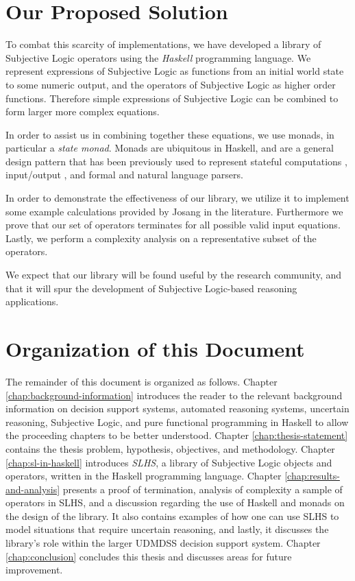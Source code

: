 \documentclass[thesis.tex]{subfiles}
\begin{document}
\section{Our Proposed Solution}

To combat this scarcity of implementations, we have developed a library of Subjective Logic
operators using the \emph{Haskell} programming language. We represent
expressions of Subjective Logic as functions from an initial world state to some
numeric output, and the operators of Subjective Logic as higher order functions.
Therefore simple expressions of Subjective Logic can be combined to form larger
more complex equations.

In order to assist us in combining together these equations, we use monads,
in particular a \emph{state monad}. Monads are ubiquitous in Haskell, and are
a general design pattern that has been previously used to represent stateful computations \cite{launchbury1994lazy},
input/output \cite{peyton1993imperative},
and formal \cite{hutton1998monadic, leijen2001parsec} and natural language
\cite{hafiz2010lazy} parsers.

In order to demonstrate the effectiveness of our library, we utilize it to implement some
example calculations provided by Josang in the literature. Furthermore we prove that our set of
operators terminates for all possible valid input equations.
Lastly, we perform a complexity analysis on a representative subset of the operators.

We expect that our library will be found useful by the research community, and that
it will spur the development of Subjective Logic-based reasoning applications.






\section{Organization of this Document}

The remainder of this document is organized as follows.
Chapter \ref{chap:background-information}
introduces the reader to the relevant background information on decision support systems,
automated reasoning systems, uncertain reasoning, Subjective Logic, and pure functional
programming in Haskell to allow the proceeding
chapters to be better understood. Chapter \ref{chap:thesis-statement} contains the thesis problem, hypothesis, objectives, and methodology.
Chapter \ref{chap:sl-in-haskell} introduces \emph{SLHS}, a library of
Subjective Logic objects and operators, written in the Haskell programming language.
Chapter \ref{chap:results-and-analysis} presents a proof of termination, analysis of complexity a sample of
operators in SLHS, and a discussion regarding the use of Haskell and monads on the design of the library.
It also contains examples of how one can use SLHS to model situations
that require uncertain reasoning, and lastly, it discusses the library's role within the larger UDMDSS decision support system.
Chapter \ref{chap:conclusion} concludes this thesis and discusses areas for future improvement.
\end{document}

